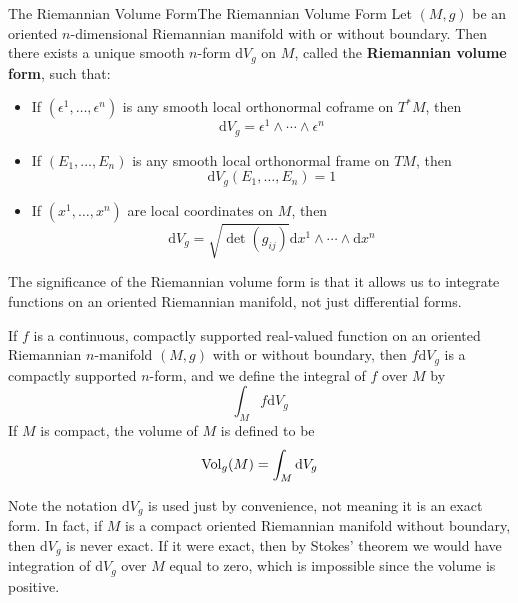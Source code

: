 \documentclass[../main.tex]{subfiles}
\begin{document}
\begin{proposition}{The Riemannian Volume Form}{The Riemannian Volume Form}
	Let $(M, g)$ be an oriented $n$-dimensional Riemannian manifold with or without boundary. Then there exists a unique smooth $n$-form $\mathrm{d} V_g$ on $M$, called the \textbf{Riemannian volume form}, such that:
	\begin{itemize}
		\item If $(\epsilon^1, \ldots, \epsilon^n)$ is any smooth local orthonormal coframe on $T^*M$, then
		      \begin{equation}
			      \mathrm{d} V_g = \epsilon^1 \wedge \cdots \wedge \epsilon^n
		      \end{equation}
		\item If $(E_1, \ldots, E_n)$ is any smooth local orthonormal frame on $TM$, then
		      \begin{equation}
			      \mathrm{d} V_g(E_1, \ldots, E_n) = 1
		      \end{equation}
		\item If $(x^1, \ldots, x^n)$ are local coordinates on $M$, then
		      \begin{equation}
			      \mathrm{d} V_g = \sqrt{\det(g_{ij})} \mathrm{d}x^1 \wedge \cdots \wedge \mathrm{d}x^n
		      \end{equation}
	\end{itemize}
\end{proposition}

The significance of the Riemannian volume form is that it allows us to integrate functions on an oriented Riemannian manifold, not just differential forms.

If $f$ is a continuous, compactly supported real-valued function on an oriented Riemannian $n$-manifold $(M, g)$ with or without boundary, then $f \mathrm{d} V_g$ is a compactly supported $n$-form, and we define the integral of $f$ over $M$ by
\begin{equation}
	\int_M f \mathrm{d} V_g
\end{equation}
If $M$ is compact, the volume of $M$ is defined to be
\begin{equation}
	\operatorname{Vol}_g(M) = \int_M \mathrm{d} V_g
\end{equation}

\begin{remark}
	Note the notation $\mathrm{d} V_g$ is used just by convenience, not meaning it is an exact form. In fact, if $M$ is a compact oriented Riemannian manifold without boundary, then $\mathrm{d} V_g$ is never exact. If it were exact, then by Stokes' theorem we would have integration of $\mathrm{d} V_g$ over $M$ equal to zero, which is impossible since the volume is positive.
\end{remark}
\end{document}
